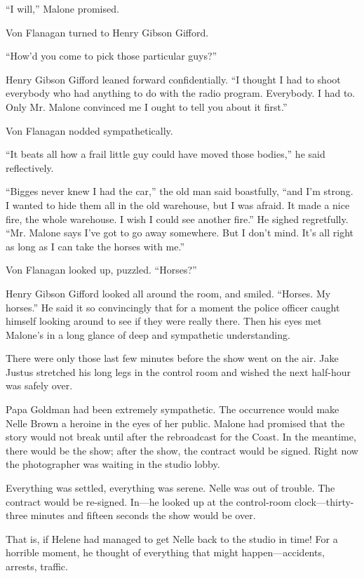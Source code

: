 \documentclass{novel}
\begin{document}
“I will,” Malone promised.

Von Flanagan turned to Henry Gibson Gifford.

“How’d you come to pick those particular guys?”

Henry Gibson Gifford leaned forward confidentially. “I thought I had to shoot everybody who had anything to do with the radio program. Everybody. I had to. Only Mr. Malone convinced me I ought to tell you about it first.”

Von Flanagan nodded sympathetically.

“It beats all how a frail little guy could have moved those bodies,” he said reflectively.

“Bigges never knew I had the car,” the old man said boastfully, “and I’m strong. I wanted to hide them all in the old warehouse, but I was afraid. It made a nice fire, the whole warehouse. I wish I could see another fire.” He sighed regretfully. “Mr. Malone says I’ve got to go away somewhere. But I don’t mind. It’s all right as long as I can take the horses with me.”

Von Flanagan looked up, puzzled. “Horses?”

Henry Gibson Gifford looked all around the room, and smiled. “Horses. My horses.” He said it so convincingly that for a moment the police officer caught himself looking around to see if they were really there. Then his eyes met Malone’s in a long glance of deep and sympathetic understanding.

There were only those last few minutes before the show went on the air. Jake Justus stretched his long legs in the control room and wished the next half-hour was safely over.

Papa Goldman had been extremely sympathetic. The occurrence would make Nelle Brown a heroine in the eyes of her public. Malone had promised that the story would not break until after the rebroadcast for the Coast. In the meantime, there would be the show; after the show, the contract would be signed. Right now the photographer was waiting in the studio lobby.

Everything was settled, everything was serene. Nelle was out of trouble. The contract would be re-signed. In—he looked up at the control-room clock—thirty-three minutes and fifteen seconds the show would be over.

That is, if Helene had managed to get Nelle back to the studio in time! For a horrible moment, he thought of everything that might happen—accidents, arrests, traffic.
\end{document}
